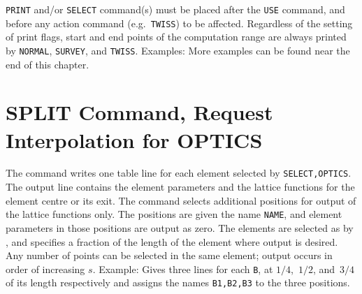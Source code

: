{\tt PRINT} and/or {\tt SELECT} command(s)
must be placed after the {\tt USE} command,
and before any action command (e.g.~{\tt TWISS}) to be affected.
Regardless of the setting of print flags,
start and end points of the computation range are always printed
by {\tt NORMAL}, {\tt SURVEY}, and {\tt TWISS}.
Examples:
More examples can be found near the end of this chapter.
 
\section{SPLIT Command, Request Interpolation for OPTICS}
\label{S-SPLIT}
The  command writes one table line for each element
selected by {\tt SELECT,OPTICS}.
The output line contains the element parameters
and the lattice functions for the element centre or its exit.
The command
selects additional positions for output of the lattice functions only.
The positions are given the name {\tt NAME},
and element parameters in those positions are output as zero.
The elements are selected as by , and 
specifies a fraction of the length of the element where output is
desired.
Any number of points can be selected in the same element;
output occurs in order of increasing \(s\).
Example:
Gives three lines for each {\tt B},
at \(1/4\),~\(1/2\), and~\(3/4\) of its length respectively
and assigns the names {\tt B1,B2,B3} to the three positions.
 
